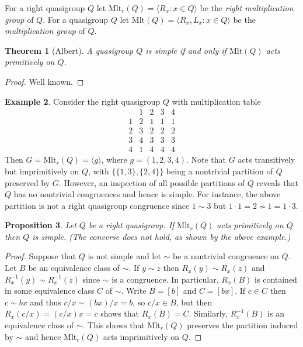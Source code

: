\documentclass{amsart}
\def\rdiv{/}
\def\rmlt#1{\mathrm{Mlt}_r(#1)}
\def\mlt#1{\mathrm{Mlt}(#1)}
\theoremstyle{plain}
\newtheorem{theorem}{Theorem}[section]
\newtheorem{proposition}[theorem]{Proposition}
\theoremstyle{definition}
\newtheorem{example}[theorem]{Example}
\begin{document}
For a right quasigroup $Q$ let $\rmlt{Q}=\langle R_x:x\in Q\rangle$ be the \emph{right multiplication group} of $Q$. For a quasigroup $Q$ let $\mlt{Q}=\langle R_x,L_x:x\in Q\rangle$ be the \emph{multiplication group} of $Q$.

\begin{theorem}[Albert]
A quasigroup $Q$ is simple if and only if $\mlt{Q}$ acts primitively on $Q$.
\end{theorem}
\begin{proof}
Well known.
\end{proof}

\begin{example}
Consider the right quasigroup $Q$ with multiplication table
\begin{displaymath}
    \begin{array}{c|cccc}
         &1&2&3&4\\
        \hline
        1&2&1&1&1\\
        2&3&2&2&2\\
        3&4&3&3&3\\
        4&1&4&4&4
    \end{array}
\end{displaymath}
Then $G=\rmlt{Q} = \langle g\rangle$, where $g=(1,2,3,4)$. Note that $G$ acts transitively but imprimitively on $Q$, with $\{\{1,3\},\{2,4\}\}$ being a nontrivial partition of $Q$ preserved by $G$. However, an inspection of all possible partitions of $Q$ reveals that $Q$ has no nontrivial congruences and hence is simple. For instance, the above partition is not a right quasigroup congruence since $1\sim 3$ but $1\cdot 1 = 2\not\sim 1 = 1\cdot 3$.
\end{example}

\begin{proposition}
Let $Q$ be a right quasigroup. If $\rmlt{Q}$ acts primitively on $Q$ then $Q$ is simple. (The converse does not hold, as shown by the above example.)
\end{proposition}
\begin{proof}
Suppose that $Q$ is not simple and let $\sim$ be a nontrivial congruence on $Q$. Let $B$ be an equivalence class of $\sim$. If $y\sim z$ then $R_x(y)\sim R_x(z)$ and $R_x^{-1}(y)\sim R_x^{-1}(z)$ since $\sim$ is a congruence. In particular, $R_x(B)$ is contained in some equivalence class $C$ of $\sim$. Write $B=[b]$ and $C=[bx]$. If $c\in C$ then $c\sim bx$ and thus $c\rdiv x\sim (bx)\rdiv x = b$, so $c\rdiv x\in B$, but then $R_x(c\rdiv x) = (c\rdiv x)x = c$ shows that $R_x(B)=C$. Similarly, $R_x^{-1}(B)$ is an equivalence class of $\sim$. This shows that $\rmlt{Q}$ preserves the partition induced by $\sim$ and hence $\rmlt{Q}$ acts imprimitively on $Q$.
\end{proof}
\end{document}
